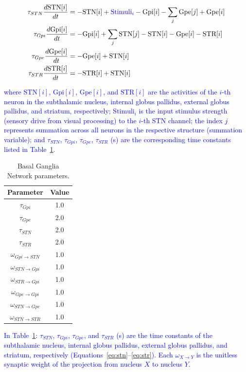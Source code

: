 \documentclass[preprint,12pt]{elsarticle}
\newcommand{\revblue}[1]{\textcolor{blue}{#1}}
\begin{document}
\begin{align}
\tau_{STN}\frac{d \text{STN}[i]}{dt} &= -\text{STN}[i] + \textcolor{blue}{\text{Stimuli}_i} - \text{Gpi}[i] - \sum_{j} \text{Gpe}[j] + \text{Gpe}[i]\label{eq:stn} \\
\tau_{Gpi}\frac{d \text{Gpi}[i]}{dt} &= - \text{Gpi}[i] + \sum_{j} \text{STN}[j]-\text{STN}[i] - \text{Gpe}[i] - \text{STR}[i]\\
\tau_{Gpe}\frac{d \text{Gpe}[i]}{dt} &= - \text{Gpe}[i] + \text{STN}[i] \\
\tau_{STR}\frac{d \text{STR}[i]}{dt} &= - \text{STR}[i] + \text{STN}[i]
\label{eq:str}
\end{align}

\revblue{where $\text{STN}[i]$, $\text{Gpi}[i]$, $\text{Gpe}[i]$, and $\text{STR}[i]$ are the activities of the $i$-th neuron in the subthalamic nucleus, internal globus pallidus, external globus pallidus, and striatum, respectively; $\text{Stimuli}_i$ is the input stimulus strength (sensory drive from visual processing) to the $i$-th STN channel; the index $j$ represents summation across all neurons in the respective structure (summation variable); and $\tau_{STN}$, $\tau_{Gpi}$, $\tau_{Gpe}$, $\tau_{STR}$ (s) are the corresponding time constants listed in Table~\ref{table:Ganglia}.}

\begin{table}[t]
\centering
\caption{Basal Ganglia Network parameters.}
\begin{tabular}{|c|c|}
\hline
\textbf{Parameter} & \textbf{Value} \\ \hline
$\tau_{Gpi}$ & 1.0 \\ \hline
$\tau_{Gpe}$ & 2.0 \\ \hline
$\tau_{STN}$ & 2.0 \\ \hline
$\tau_{STR}$ & 2.0 \\ \hline
$\omega_{Gpi\rightarrow STN}$ & 1.0 \\ \hline
$\omega_{STN\rightarrow Gpi}$ & 1.0 \\ \hline
$\omega_{STR\rightarrow Gpi}$ & 1.0 \\ \hline
$\omega_{Gpe\rightarrow Gpi}$ & 1.0 \\ \hline
$\omega_{STN\rightarrow Gpe}$ & 1.0 \\ \hline
$\omega_{STN\rightarrow STR}$ & 1.0 \\ \hline
\end{tabular}
\label{table:Ganglia}
\end{table}

\revblue{In Table~\ref{table:Ganglia}: $\tau_{STN}$, $\tau_{Gpi}$, $\tau_{Gpe}$, and $\tau_{STR}$ (s) are the time constants of the subthalamic nucleus, internal globus pallidus, external globus pallidus, and striatum, respectively (Equations~\eqref{eq:stn}--\eqref{eq:str}).
Each $\omega_{X\rightarrow Y}$ is the unitless synaptic weight of the projection from nucleus $X$ to nucleus $Y$.}
\end{document}
